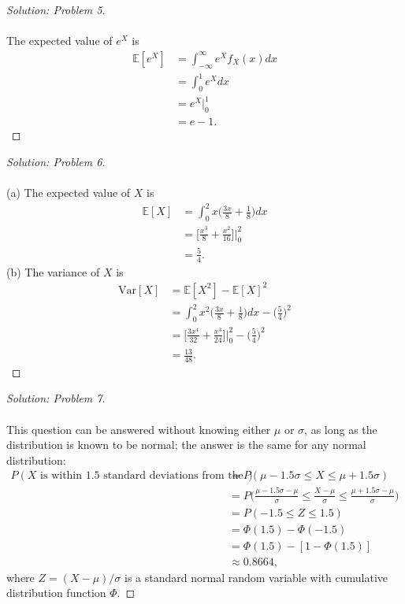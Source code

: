 \documentclass[10pt]{article}
\begin{document}
\vspace{0.2cm}
\begin{proof}[Solution: Problem 5]
\text{}\\
\text{}\\
The expected value of $e^X$ is
\begin{align*}
\mathbb{E}[e^X] &= \int_{-\infty}^\infty e^X f_X(x) dx\\
&= \int_0^1 e^X dx\\
&= e^X\big|^1_0\\
&= e - 1.
\end{align*}
\end{proof}

\vspace{0.2cm}
\begin{proof}[Solution: Problem 6]
\text{}\\
\text{}\\
(a)
The expected value of $X$ is
\begin{align*}
\mathbb{E}[X] &= \int_0^2 x \bigg(\frac{3x}{8} + \frac{1}{8}\bigg)dx\\
&= \bigg[\frac{x^3}{8} + \frac{x^2}{16}\bigg]\bigg|^2_0\\
&= \frac{5}{4}.
\end{align*}
(b) The variance of $X$ is
\begin{align*}
\mathrm{Var}[X] &= \mathbb{E}[X^2] - \mathbb{E}[X]^2\\
&= \int_0^2 x^2 \bigg(\frac{3x}{8} + \frac{1}{8}\bigg)dx - \bigg(\frac{5}{4}\bigg)^2\\
&= \bigg[\frac{3x^4}{32} + \frac{x^3}{24}\bigg]\bigg|^2_0 - \bigg(\frac{5}{4}\bigg)^2\\
&= \frac{13}{48}.
\end{align*}
\end{proof}

\begin{proof}[Solution: Problem 7]
\text{}\\
\text{}\\
This question can be answered without knowing either $\mu$ or $\sigma$, as long as the distribution is known to be normal; the answer is the same for any normal distribution:
\begin{align*}
P(\text{$X$ is within 1.5 standard deviations from the mean}) &= P(\mu - 1.5 \sigma \leq X \leq \mu + 1.5 \sigma)\\
&= P\bigg(\frac{\mu - 1.5 \sigma - \mu}{\sigma} \leq \frac{X - \mu}{\sigma} \leq \frac{\mu + 1.5 \sigma  - \mu}{\sigma}\bigg)\\
&= P(- 1.5  \leq Z \leq 1.5)\\
&= \Phi(1.5) -  \Phi(-1.5)\\
&= \Phi(1.5) -  [1 - \Phi(1.5)]\\
&\approx 0.8664,
\end{align*}
where $Z = (X - \mu)/\sigma$ is a standard normal random variable with cumulative distribution function $\Phi$.
\end{proof}
\end{document}
